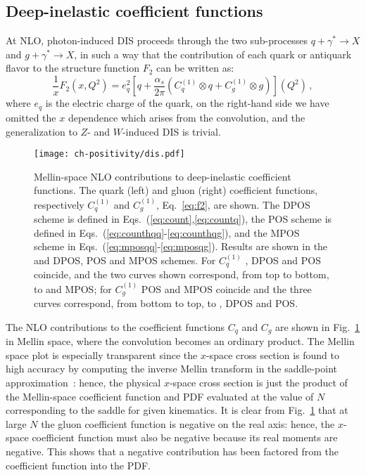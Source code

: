 \subsection{Deep-inelastic coefficient functions}
\label{sec:discf}
At NLO, photon-induced DIS proceeds through the two
sub-processes $q+\gamma^*\to X$ and $g+\gamma^*\to X$, in such a way
that the contribution of each quark or antiquark flavor to the
structure function $F_2$ can be written as:
\begin{equation}\label{eq:f2}
 \frac{1}{x} F_2(x,Q^2)= e_q^2 \left[q
 +\frac{\alpha_s}{2\pi}\left( C^{(1)}_q \otimes q+ C^{(1)}_g \otimes
 g\right)\right](Q^2)\,,
 \end{equation}
where $e_q$ is the electric charge of the quark, on the right-hand
side we have omitted the $x$ dependence which arises from the
convolution,
and the
generalization to $Z$- and $W$-induced DIS is trivial.

\begin{figure}[t]
  \begin{center}
    \texttt{[image: ch-positivity/dis.pdf]}
    \caption{\small Mellin-space NLO contributions to deep-inelastic coefficient
      functions. The quark (left) and gluon (right) coefficient
      functions, respectively $C_q^{(1)}$ and $C_g^{(1)}$, Eq.~\ref{eq:f2}, are
      shown. The DPOS
      scheme is defined in Eqs.~(\ref{eq:count},\ref{eq:countq}), the POS
      scheme is defined in Eqs.~(\ref{eq:counthqq}-\ref{eq:counthqg}),
      and the MPOS scheme
      in Eqs.~(\ref{eq:mposqq}-\ref{eq:mposqg}).
      Results are shown in the \msbar{} and DPOS, POS and MPOS
      schemes. For  $C_q^{(1)}$ \msbar{}, DPOS and POS
      coincide, and the two curves shown correspond, from top to
      bottom, to \msbar{} and MPOS; for $C_g^{(1)}$ POS and MPOS
      coincide and the three
      curves correspond,
      from  bottom to top, to \msbar{}, DPOS and POS.
    \label{fig:dis} }
  \end{center}
\end{figure}
  The
  \msbar{} NLO contributions to the coefficient functions
  $C_q$ and $C_g$ are shown in Fig.~\ref{fig:dis} in Mellin space,
  where the convolution becomes an ordinary product. The
  Mellin space plot is especially transparent since the $x$-space
  cross section is found to high accuracy by computing the inverse
  Mellin transform in the saddle-point
  approximation~\cite{Bonvini:2012an}: hence, the physical  $x$-space
  cross section is just the product of the Mellin-space coefficient
  function and PDF evaluated at the value of $N$ corresponding to the
  saddle for given kinematics. 
  It is clear  from Fig.~\ref{fig:dis} that at
  large $N$ the gluon coefficient function is negative on the real
  axis: hence, the $x$-space coefficient function must also be
  negative because its real moments are negative. This shows
 that a negative contribution has been factored from the coefficient
 function into the PDF. 


